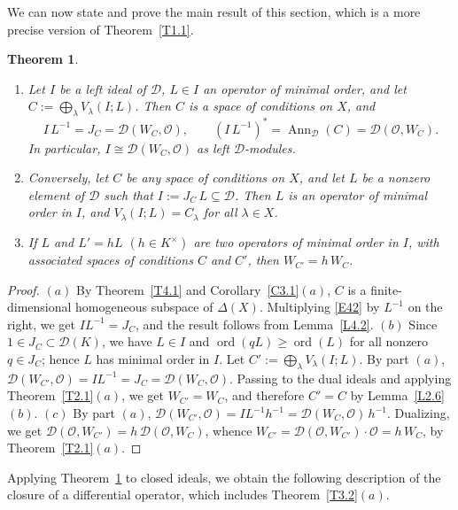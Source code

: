 \documentclass[11pt,reqno]{amsart}
\theoremstyle{plain}
\newtheorem{theorem}{Theorem}[section]
\theoremstyle{definition}
\theoremstyle{remark}
\numberwithin{equation}{section}
\newcommand{\cD}{\mathcal{D}}
\newcommand{\cO}{\mathcal{O}}
\DeclareMathOperator{\Ann}{Ann}
\DeclareMathOperator{\ord}{ord}
\begin{document}
We can now state and prove the main result of this section, which is a more precise version of
Theorem~\ref{T1.1}.

\begin{theorem}
\label{T4.2}
\begin{enumerate}
\item[$(a)$] Let $I$ be a left ideal of $\cD$, $L \in I$ an operator of minimal order, and let
$C := \bigoplus_{\lambda} V_\lambda(I;L)$. Then $C$ is a space of conditions on $X$, and
\[
  I\, L^{-1} = J_C = \cD(W_C, \cO) , \qquad (I\, L^{-1})^* = \Ann_{\cD}(C) = \cD(\cO, W_C) .
\]
In particular, $I \cong \cD(W_C, \cO)$ as left $\cD$-modules.
\item[$(b)$] Conversely, let $C$ be any space of conditions on $X$, and let $L$ be a nonzero
element of $\cD$ such that $I := J_C\, L \subseteq \cD$. Then $L$ is an operator of minimal order
in $I$, and $V_\lambda(I; L) = C_\lambda$ for all $\lambda \in X$.
\item[$(c)$] If $L$ and $L' = h L$ $(h \in K^\times)$ are two operators of minimal order in $I$,
with associated spaces of conditions $C$ and $C'$, then $W_{C'} = h\, W_C$.
\end{enumerate}
\end{theorem}

\begin{proof}
$(a)$ By Theorem~\ref{T4.1} and Corollary~\ref{C3.1}$(a)$, $C$ is a finite-dimensional
homogeneous subspace of $\Delta(X)$. Multiplying \eqref{E42} by $L^{-1}$ on the right, we get
$I L^{-1} = J_C$, and the result follows from Lemma~\ref{L4.2}. $(b)$ Since $1 \in J_C \subset
\cD(K)$, we have $L \in I$ and $\ord(qL) \ge \ord(L)$ for all nonzero $q \in J_C$; hence $L$ has
minimal order in $I$. Let $C' := \bigoplus_\lambda V_\lambda(I;L)$. By part $(a)$,
$\cD(W_{C'}, \cO) = I L^{-1} = J_C = \cD(W_C, \cO)$. Passing to the dual ideals and applying
Theorem~\ref{T2.1}$(a)$, we get $W_{C'} = W_C$, and therefore $C' = C$ by Lemma~\ref{L2.6}$(b)$.
$(c)$ By part $(a)$, $\cD(W_{C'}, \cO) = I L^{-1} h^{-1} = \cD(W_C, \cO)\, h^{-1}$. Dualizing, we
get $\cD(\cO, W_{C'}) = h\, \cD(\cO, W_C)$, whence $W_{C'} = \cD(\cO, W_{C'}) \cdot \cO = h\,
W_C$, by Theorem~\ref{T2.1}$(a)$.
\end{proof}

Applying Theorem~\ref{T4.2} to closed ideals, we obtain the following description of the closure
of a differential operator, which includes Theorem~\ref{T3.2}$(a)$.
\end{document}
